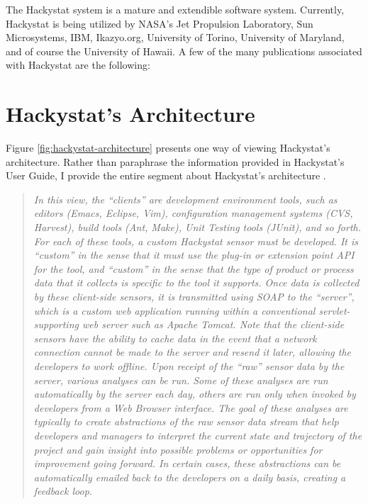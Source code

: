 The Hackystat system is a mature and extendible software system. Currently,
Hackystat is being utilized by NASA's Jet Propulsion Laboratory, Sun
Microsystems, IBM, Ikazyo.org, University of Torino, University of
Maryland, and of course the University of Hawaii. A few of the many
publications associated with Hackystat are the following:
\cite{csdl2-04-22, csdl2-04-13, csdl2-04-11, csdl2-03-12, csdl2-02-07,
  csdl2-03-07, csdl2-04-02, csdl2-04-04, csdl2-04-06}

\section{Hackystat's Architecture}
Figure \ref{fig:hackystat-architecture} presents one way of viewing
Hackystat's architecture. Rather than paraphrase the information provided
in Hackystat's User Guide, I provide the entire segment about Hackystat's
architecture \cite{Johnson05}. 

\begin{quotation}
  \textit{ In this view, the ``clients'' are development environment tools,
    such as editors (Emacs, Eclipse, Vim), configuration management systems
    (CVS, Harvest), build tools (Ant, Make), Unit Testing tools (JUnit),
    and so forth. For each of these tools, a custom Hackystat sensor must
    be developed. It is ``custom'' in the sense that it must use the
    plug-in or extension point API for the tool, and ``custom'' in the
    sense that the type of product or process data that it collects is
    specific to the tool it supports. \newline \newline Once data is
    collected by these client-side sensors, it is transmitted using SOAP to
    the ``server'', which is a custom web application running within a
    conventional servlet-supporting web server such as Apache Tomcat. Note
    that the client-side sensors have the ability to cache data in the
    event that a network connection cannot be made to the server and resend
    it later, allowing the developers to work offline. \newline \newline
    Upon receipt of the ``raw'' sensor data by the server, various analyses
    can be run. Some of these analyses are run automatically by the server
    each day, others are run only when invoked by developers from a Web
    Browser interface. The goal of these analyses are typically to create
    abstractions of the raw sensor data stream that help developers and
    managers to interpret the current state and trajectory of the project
    and gain insight into possible problems or opportunities for
    improvement going forward. \newline \newline In certain cases, these
    abstractions can be automatically emailed back to the developers on a
    daily basis, creating a feedback loop.}
\end{quotation}

